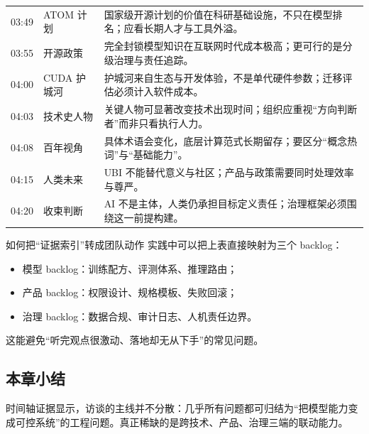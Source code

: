 \begin{longtable}{p{}p{}p{}}
03:49 & ATOM 计划 & 国家级开源计划的价值在科研基础设施，不只在模型排名；应看长期人才与工具外溢。 \\
03:55 & 开源政策 & 完全封锁模型知识在互联网时代成本极高；更可行的是分级治理与责任追踪。 \\
04:00 & CUDA 护城河 & 护城河来自生态与开发体验，不是单代硬件参数；迁移评估必须计入软件成本。 \\
04:03 & 技术史人物 & 关键人物可显著改变技术出现时间；组织应重视“方向判断者”而非只看执行人力。 \\
04:08 & 百年视角 & 具体术语会变化，底层计算范式长期留存；要区分“概念热词”与“基础能力”。 \\
04:15 & 人类未来 & UBI 不能替代意义与社区；产品与政策需要同时处理效率与尊严。 \\
04:20 & 收束判断 & AI 不是主体，人类仍承担目标定义责任；治理框架必须围绕这一前提构建。 \\
\bottomrule
\end{longtable}

\begin{knowledgebox}{如何把“证据索引”转成团队动作}
实践中可以把上表直接映射为三个 backlog：
\begin{itemize}[leftmargin=1.5em]
    \item 模型 backlog：训练配方、评测体系、推理路由；
    \item 产品 backlog：权限设计、规格模板、失败回滚；
    \item 治理 backlog：数据合规、审计日志、人机责任边界。
\end{itemize}
这能避免“听完观点很激动、落地却无从下手”的常见问题。
\end{knowledgebox}

\subsection{本章小结}

时间轴证据显示，访谈的主线并不分散：几乎所有问题都可归结为“把模型能力变成可控系统”的工程问题。真正稀缺的是跨技术、产品、治理三端的联动能力。

